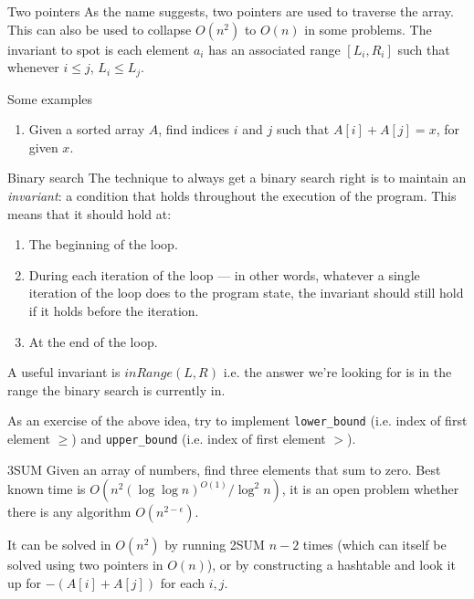 \documentclass[titlepage, 12pt]{book}
\begin{document}
\begin{algorithm}{Two pointers}{}
    As the name suggests, two pointers are used to traverse the array. This can
    also be used to collapse $O(n^2)$ to $O(n)$ in some problems. The invariant
    to spot is each element $a_i$ has an associated range $[L_i, R_i]$ such that
    whenever $i\leq j$, $L_i\leq L_j$.

    Some examples
    \begin{enumerate}
        \item Given a sorted array $A$, find indices $i$ and $j$ such that $A[i]
            + A[j] = x$, for given $x$.
    \end{enumerate}
\end{algorithm}

\begin{algorithm}{Binary search}{}
    The technique to always get a binary search right is to maintain an
    \textit{invariant}: a condition that holds throughout the execution of the
    program. This means that it should hold at:
    \begin{enumerate}
        \item The beginning of the loop.
        \item During each iteration of the loop --- in other words, whatever
            a single iteration of the loop does to the program state, the
            invariant should still hold if it holds before the iteration.
        \item At the end of the loop.
    \end{enumerate}
    A useful invariant is $inRange(L, R)$ i.e. the answer we're looking for is
    in the range the binary search is currently in.
\end{algorithm}
As an exercise of the above idea, try to implement \verb|lower_bound| (i.e.
index of first element $\geq$) and \verb|upper_bound| (i.e. index of first
element $>$).

\begin{problem}{3SUM}{}
    Given an array of numbers, find three elements that sum to zero. Best known
    time is $O(n^2(\log\log n)^{O(1)}/\log^2 n)$, it is an open problem whether there
    is any algorithm $O(n^{2 - \epsilon})$.
\end{problem}

It can be solved in $O(n^2)$ by running 2SUM $n - 2$ times (which can itself be
solved using two pointers in $O(n)$), or by constructing a hashtable and look it
up for $- (A[i] + A[j])$ for each $i, j$.
\end{document}
